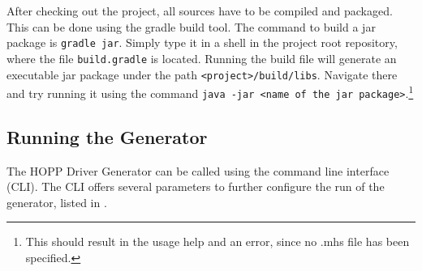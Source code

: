 \documentclass{report}
\begin{document}
After checking out the project, all sources have to be compiled and packaged. This can be done using the gradle build tool. The command to build a jar package is \texttt{gradle jar}. Simply type it in a shell in the project root repository, where the file \texttt{build.gradle} is located. Running the build file will generate an executable jar package under the path \texttt{<project>/build/libs}. Navigate there and try running it using the command \texttt{java -jar <name of the jar package>}.\footnote{This should result in the usage help and an error, since no .mhs file has been specified.} 

\subsection{Running the Generator}
The HOPP Driver Generator can be called using the command line interface (CLI). The CLI offers several parameters to further configure the run of the generator, listed in .
\end{document}

